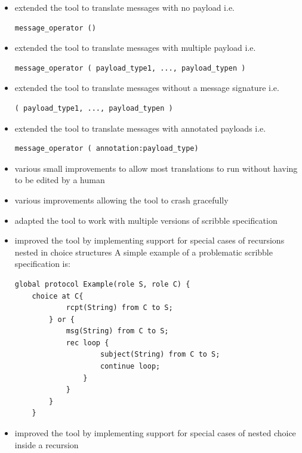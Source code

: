 \begin{itemize}
  \item extended the tool to translate messages with no payload i.e.
  \begin{lstlisting}[basicstyle=\footnotesize]
    message_operator ()
  \end{lstlisting}
  \item extended the tool to translate messages with multiple payload i.e.
  \begin{lstlisting}[basicstyle=\footnotesize]
    message_operator ( payload_type1, ..., payload_typen )
  \end{lstlisting}
  \item extended the tool to translate messages without a message signature i.e.
  \begin{lstlisting}[basicstyle=\footnotesize]
    ( payload_type1, ..., payload_typen )
  \end{lstlisting}
  \item extended the tool to translate messages with annotated payloads i.e.
  \begin{lstlisting}[basicstyle=\footnotesize]
    message_operator ( annotation:payload_type)
  \end{lstlisting}
  \item various small improvements to allow most translations to run without having to be edited by a human
  \item various improvements allowing the tool to crash gracefully
  \item adapted the tool to work with multiple versions of scribble specification
  \item improved the tool by implementing support for special cases of recursions nested in choice structures
  A simple example of a problematic scribble specification is:
  \begin{lstlisting}[basicstyle=\footnotesize]
    global protocol Example(role S, role C) {
    choice at C{
            rcpt(String) from C to S;
        } or {
            msg(String) from C to S;
            rec loop {
                    subject(String) from C to S;
                    continue loop;
                }
            }
        }
    }
  \end{lstlisting}
  \item improved the tool by implementing support for special cases of nested choice inside a recursion


\end{itemize}
